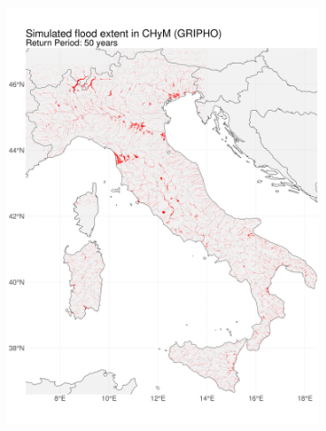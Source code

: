 \begin{figure}
    \centering
    \begin{subfigure}{.49\textwidth}
        \includegraphics[width=\textwidth]{figures/valid_flood/flooded_areas/T50}
    \end{subfigure}
    \begin{subfigure}{.49\textwidth}

\end{subfigure}
\end{figure}
